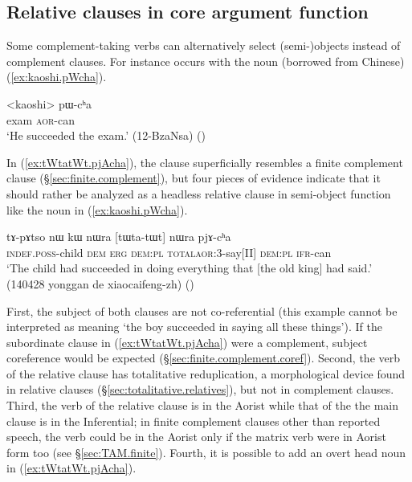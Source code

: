 \subsection{Relative clauses in core argument function}   \label{sec:relative.core.arg}
Some complement-taking verbs can alternatively select (semi-)objects instead of complement clauses. For instance  occurs with the noun  (borrowed from Chinese) (\ref{ex:kaoshi.pWcha}).

\begin{exe}
	\ex \label{ex:kaoshi.pWcha}
	\gll   <kaoshi> pɯ-cʰa  \\
	exam \textsc{aor}-can \\
	\glt `He succeeded the exam.' (12-BzaNsa)
	()
\end{exe}

In (\ref{ex:tWtatWt.pjAcha}), the clause  superficially resembles a finite complement clause (§\ref{sec:finite.complement}), but four pieces of evidence indicate that it should rather be analyzed as a headless relative clause in semi-object function like the noun  in (\ref{ex:kaoshi.pWcha}).

\begin{exe}
	\ex \label{ex:tWtatWt.pjAcha}
	\gll  tɤ-pɤtso nɯ kɯ nɯra [tɯ\redp{}ta-tɯt] nɯra pjɤ-cʰa \\
	\textsc{indef}.\textsc{poss}-child \textsc{dem} \textsc{erg} \textsc{dem}:\textsc{pl} \textsc{total}\redp{}\textsc{aor}:3\flobv{}-say[II] \textsc{dem}:\textsc{pl} \textsc{ifr}-can \\
	\glt `The child had succeeded in doing everything that [the old king] had said.' (140428 yonggan de xiaocaifeng-zh)
	()
\end{exe}

First, the subject of both clauses are not co-referential (this example cannot be interpreted as meaning `the boy succeeded in saying all these things'). If the subordinate clause in (\ref{ex:tWtatWt.pjAcha}) were a complement, subject coreference would be expected (§\ref{sec:finite.complement.coref}). Second, the verb of the relative clause has totalitative reduplication, a morphological device  found in relative clauses (§\ref{sec:totalitative.relatives}), but not in complement clauses. Third, the verb of the relative clause is in the Aorist while that of the the main clause is in the Inferential; in finite complement clauses other than reported speech, the verb could be in the Aorist only if the matrix verb were in Aorist form too (see §\ref{sec:TAM.finite}). Fourth, it is possible to add an overt head noun in (\ref{ex:tWtatWt.pjAcha}).


